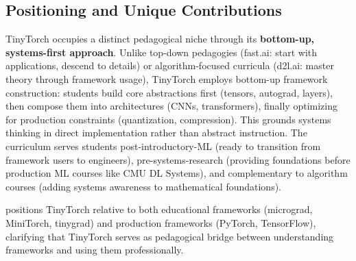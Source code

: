 \documentclass[10pt,twocolumn]{article}
\begin{document}
\subsection{Positioning and Unique Contributions}

TinyTorch occupies a distinct pedagogical niche through its \textbf{bottom-up, systems-first approach}. Unlike top-down pedagogies (fast.ai: start with applications, descend to details) or algorithm-focused curricula (d2l.ai: master theory through framework usage), TinyTorch employs bottom-up framework construction: students build core abstractions first (tensors, autograd, layers), then compose them into architectures (CNNs, transformers), finally optimizing for production constraints (quantization, compression). This grounds systems thinking in direct implementation rather than abstract instruction. The curriculum serves students post-introductory-ML (ready to transition from framework users to engineers), pre-systems-research (providing foundations before production ML courses like CMU DL Systems), and complementary to algorithm courses (adding systems awareness to mathematical foundations).

 positions TinyTorch relative to both educational frameworks (micrograd, MiniTorch, tinygrad) and production frameworks (PyTorch, TensorFlow), clarifying that TinyTorch serves as pedagogical bridge between understanding frameworks and using them professionally.
\end{document}
